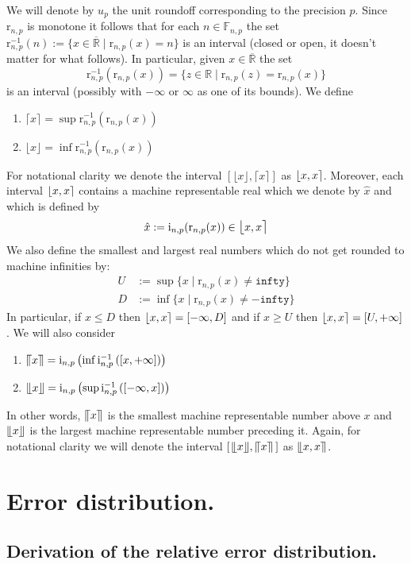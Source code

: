 \documentclass[10pt,a4paper]{article}
\theoremstyle{plain}
\theoremstyle{definition}
\newcommand{\F}[1][n,p]{\mathbb{F}_{#1}}
\newcommand{\R}{\mathbb{R}}
\newcommand{\eR}{\overline{\R}}
\newcommand{\Rep}[1][n,p]{\mathrm{i}_{#1}}
\newcommand{\Round}[1][n,p]{\mathrm{r}_{#1}}
\newcommand{\ceil}[1]{\lceil #1 \rceil}
\newcommand{\floor}[1]{\lfloor #1 \rfloor}
\newcommand{\cceil}[1]{\llceil #1 \rrceil}
\newcommand{\ffloor}[1]{\llfloor #1 \rrfloor}
\newcommand{\inv}{^{-1}}
\newcommand{\fintvl}[1][x]{\mathlarger{\lfloor}#1,#1\mathlarger{\rceil}}
\newcommand{\ffintvl}[1][x]{\mathlarger{\llfloor}#1,#1\mathlarger{\rrceil}}
\newcommand{\uro}[1][p]{u_{#1}}
\begin{document}
We will denote by $\uro$ the unit roundoff corresponding to the precision $p$. Since $\Round$ is monotone it follows that for each $n\in\F$ the set $\Round\inv(n):=\{x\in\eR\mid \Round(x)=n\}$ is an interval (closed or open, it doesn't matter for what follows). In particular, given $x\in \eR$ the set
\[
\Round\inv(\Round(x))=\{z\in\R\mid \Round(z)=\Round(x)\}
\]
is an interval (possibly with $-\infty$ or $\infty$ as one of its bounds). We define
\begin{enumerate}
\item $\ceil{x}=\sup \Round\inv(\Round(x))$
\item $\floor{x}=\inf \Round\inv(\Round(x))$
\end{enumerate}
For notational clarity we denote the interval $\left[\floor{x},\ceil{x}\right]$ as $\fintvl$.
Moreover, each interval $\fintvl$ contains a machine representable real which we denote by $\hat{x}$ and which is defined by
\[
\hat{x}:=\Rep(\Round(x))\in \fintvl
\]
We also define the smallest and largest real numbers which do not get rounded to machine infinities by:
\begin{align*}
U&:=\sup\{x\mid \Round(x)\neq\mathtt{infty}\}\\
D&:=\inf\{x\mid \Round(x)\neq-\mathtt{infty}\}
\end{align*}
In particular, if $x\leq D$ then $\fintvl=\left[-\infty,D\right]$ and if $x\geq U$ then $\fintvl=\left[U,+\infty\right]$.
We will also consider 
\begin{enumerate}
\item $\cceil{x}= \Rep\left(\inf \Rep\inv\left(\left[x,+\infty\right]\right)\right) $
\item $\ffloor{x}=\Rep\left(\sup \Rep\inv\left(\left[-\infty,x\right]\right)\right)$
\end{enumerate}
In other words, $\cceil{x}$ is the smallest machine representable number above $x$ and $\ffloor{x}$ is the largest machine representable number preceding it. Again, for notational clarity we will denote the interval  $\left[\hspace{1pt}\ffloor{x},\cceil{x}\hspace{2pt}\right]$ as $\ffintvl$.




\section{Error distribution.}

\subsection{Derivation of the relative error distribution.}
\end{document}
